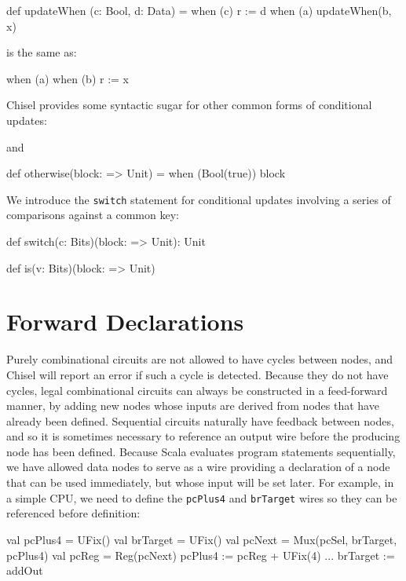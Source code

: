 \documentclass[10pt,twocolumn]{article}
\def\code#1{{\small\tt #1}}
\begin{document}
\begin{scala}
def updateWhen (c: Bool, d: Data) =
  when (c) { r := d }
when (a) { 
  updateWhen(b, x)
}
\end{scala}

\noindent
is the same as:

\begin{scala}
when (a) { 
  when (b) { r := x } 
}
\end{scala}


Chisel provides some syntactic sugar for other common forms of
conditional updates:

\begin{scala}
def unless(c: Bool)(block: => Unit) = 
  when (!c) { block )
\end{scala}

\noindent 
and

\begin{scala}
def otherwise(block: => Unit) = 
  when (Bool(true)) { block }
\end{scala}

We introduce the \code{switch} statement for conditional updates
involving a series of comparisons against a common key:

\begin{scala}
def switch(c: Bits)(block: => Unit): Unit

def is(v: Bits)(block: => Unit)
\end{scala}

\section{Forward Declarations}

Purely combinational circuits are not allowed to have cycles between
nodes, and Chisel will report an error if such a cycle is detected.
Because they do not have cycles, legal combinational circuits can
always be constructed in a feed-forward manner, by adding new nodes
whose inputs are derived from nodes that have already been defined.
Sequential circuits naturally have feedback between nodes, and so it
is sometimes necessary to reference an output wire before the
producing node has been defined.  Because Scala evaluates program
statements sequentially, we have allowed data nodes to serve as a wire
providing a declaration of a node that can be used immediately, but
whose input will be set later.  For example, in a simple CPU, we need
to define the \verb!pcPlus4!  and \verb!brTarget! wires so they can be
referenced before definition:
\begin{scala}
val pcPlus4  = UFix()
val brTarget = UFix()
val pcNext   = Mux(pcSel, brTarget, pcPlus4)
val pcReg    = Reg(pcNext)
pcPlus4     := pcReg + UFix(4)
...
brTarget    := addOut
\end{scala}
\end{document}
